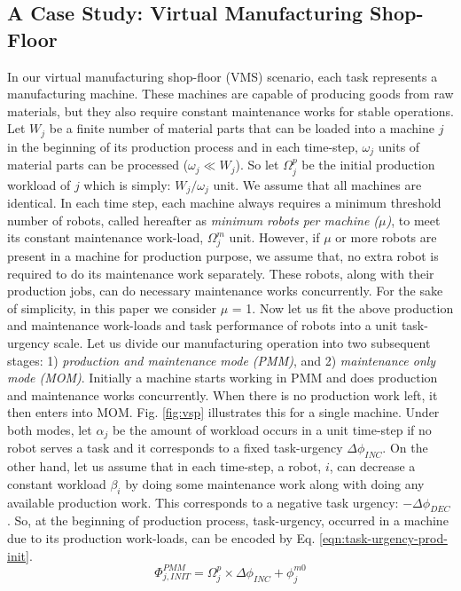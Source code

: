 \subsection{A Case Study: Virtual Manufacturing Shop-Floor}
\label{sec:afm:vms}
In our virtual manufacturing shop-floor (VMS) scenario, each task represents a manufacturing machine. These machines are capable of producing goods from raw materials, but they also require constant maintenance works for stable operations. Let $W_{j}$ be a finite number of material parts that can be loaded into a machine $j$ in the beginning of its production process and in each time-step, $\omega_{j}$ units of material parts can be processed  ($\omega_{j} \ll W_{j} $). So let $\Omega_{j}^{p}$ be the initial production workload of $j$ which is simply: $W_{j} / \omega_{j}$ unit. We assume that all machines are identical. In each time step, each machine always requires a minimum threshold number of robots, called hereafter as {\em minimum robots per machine ($\mu$)}, to meet its constant maintenance work-load, $\Omega_{j}^{m}$ unit. However, if $\mu$ or more robots are present in a machine for production purpose, we assume that, no extra robot is required to do its maintenance work separately. These robots, along with their production jobs, can do necessary maintenance works concurrently. For the sake of simplicity, in this paper we consider $\mu$ = 1.
Now let us fit the above production and maintenance work-loads and task performance of robots into a unit task-urgency scale. Let us divide our manufacturing operation into two subsequent stages: 1) {\em production and maintenance mode (PMM)}, and 2) {\em maintenance only mode (MOM)}. Initially a machine starts working in PMM and does production and maintenance works concurrently. When there is no production work left, it then enters into MOM. Fig. \ref{fig:vsp} illustrates this for a single machine.
Under both modes, let $\alpha_{j}$ be the amount of workload occurs in a unit time-step if no robot serves a task and it corresponds to a fixed task-urgency $\Delta \phi_{INC}$. On the other hand, let us assume that in each time-step, a robot, $i$, can decrease a constant workload $\beta_{i}$ by doing some maintenance work along with doing any available production work. This  corresponds to a negative task urgency: $- \Delta \phi_{DEC}$. 
So, at the beginning of production process, task-urgency, occurred in a machine due to its production work-loads, can be encoded by Eq. \ref{eqn:task-urgency-prod-init}.
\begin{equation}
\Phi_{j, INIT}^{PMM} = \Omega_{j}^{p} \times \Delta \phi_{INC} + \phi_{j}^{m0}
\label{eqn:task-urgency-prod-init}
\end{equation}
